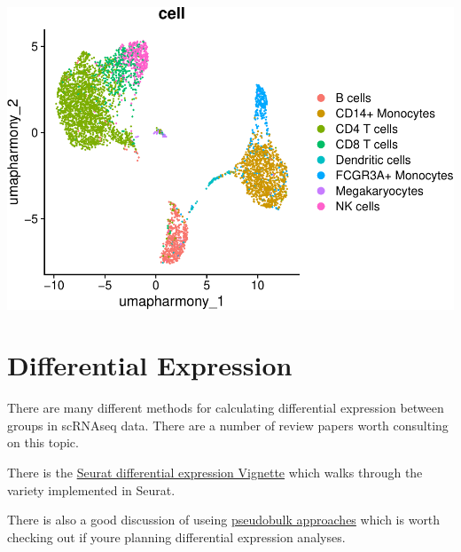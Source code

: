 \documentclass[
]{book}
\begin{document}
\includegraphics{scRNAseqInR_ABACBS_2024_Doco_files/figure-latex/unnamed-chunk-38-2.pdf}

\hypertarget{de2}{%
\chapter{Differential Expression}\label{de2}}

There are many different methods for calculating differential expression between groups in scRNAseq data. There are a number of review papers worth consulting on this topic.

There is the \href{https://satijalab.org/seurat/archive/v3.1/de_vignette.html}{Seurat differential expression Vignette} which walks through the variety implemented in Seurat.

There is also a good discussion of useing \href{http://bioconductor.org/books/3.15/OSCA.multisample/multi-sample-comparisons.html\#creating-pseudo-bulk-samples}{pseudobulk approaches} which is worth checking out if youre planning differential expression analyses.
\end{document}

